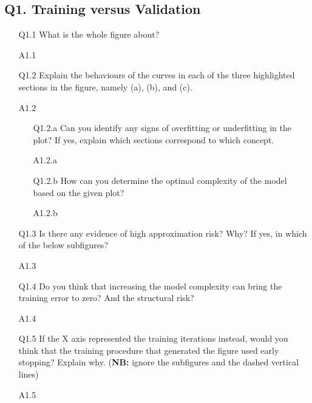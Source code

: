 \documentclass[11pt]{scrartcl}
\begin{document}
\subsection*{Q1. Training versus Validation}
\begin{itemize}
\item[Q1.1] What is the whole figure about?  
\item[A1.1] ~\\

\item[Q1.2] Explain the behaviours of the curves in each of the three highlighted sections in the figure, namely (a), (b), and (c).   
\item[A1.2] ~\\

\begin{itemize}
\item[Q1.2.a] Can you identify any signs of overfitting or underfitting in the plot? If yes, explain which sections correspond to which concept.
\item[A1.2.a] ~\\

\item[Q1.2.b] How can you determine the optimal complexity of the model based on the given plot?
\item[A1.2.b] ~\\
\end{itemize}
	
\item[Q1.3] Is there any evidence of high approximation risk? Why? If yes, in which of the below subfigures?  
\item[A1.3] ~\\

\item[Q1.4] Do you think that increasing the model complexity can bring the training error to zero? And the structural risk?  
\item[A1.4] ~\\

\item[Q1.5] If the X axis represented the training iterations instead, would you think that the training procedure that generated the figure used early stopping? Explain why. (\textbf{NB:} ignore the subfigures and the dashed vertical lines)
\item[A1.5] ~\\

\end{itemize}
\end{document}
